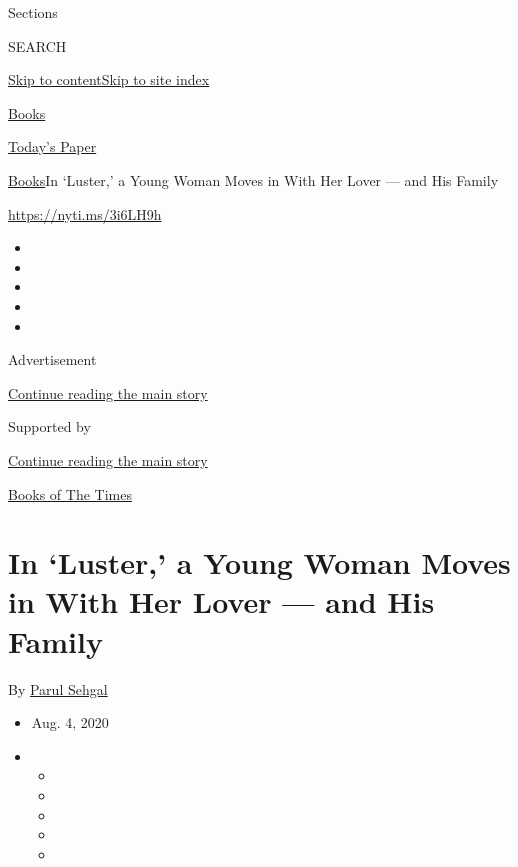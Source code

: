Sections

SEARCH

\protect\hyperlink{site-content}{Skip to
content}\protect\hyperlink{site-index}{Skip to site index}

\href{https://www.nytimes3xbfgragh.onion/section/books}{Books}

\href{https://myaccount.nytimes3xbfgragh.onion/auth/login?response_type=cookie\&client_id=vi}{}

\href{https://www.nytimes3xbfgragh.onion/section/todayspaper}{Today's
Paper}

\href{/section/books}{Books}\textbar{}In `Luster,' a Young Woman Moves
in With Her Lover --- and His Family

\url{https://nyti.ms/3i6LH9h}

\begin{itemize}
\item
\item
\item
\item
\item
\end{itemize}

Advertisement

\protect\hyperlink{after-top}{Continue reading the main story}

Supported by

\protect\hyperlink{after-sponsor}{Continue reading the main story}

\href{/column/books-of-the-times}{Books of The Times}

\hypertarget{in-luster-a-young-woman-moves-in-with-her-lover--and-his-family}{%
\section{In `Luster,' a Young Woman Moves in With Her Lover --- and His
Family}\label{in-luster-a-young-woman-moves-in-with-her-lover--and-his-family}}

By \href{https://www.nytimes3xbfgragh.onion/by/parul-sehgal}{Parul
Sehgal}

\begin{itemize}
\item
  Aug. 4, 2020
\item
  \begin{itemize}
  \item
  \item
  \item
  \item
  \item
  \end{itemize}
\end{itemize}

